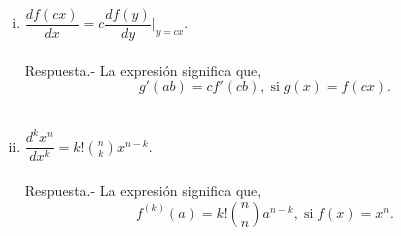 \begin{enumerate}[\bfseries 1]
\begin{enumerate}[(i)]
	    \item $\dfrac{df(cx)}{dx}=c\dfrac{df(y)}{dy}\bigg|_{y=cx}$.\\\\
		Respuesta.-\; La expresión significa que,
		$$g'(ab)=cf'(cb),\; \mbox{si}\; g(x)=f(cx).$$\\

	    \item $\dfrac{d^kx^n}{dx^k}=k!\displaystyle{n\choose k}x^{n-k}$.\\\\
		Respuesta.-\; La expresión significa que,
		$$f^{(k)}(a)=k!{n\choose n}a^{n-k},\;  \mbox{si}\; f(x)=x^n.$$\\

	\end{enumerate}

\end{enumerate}
